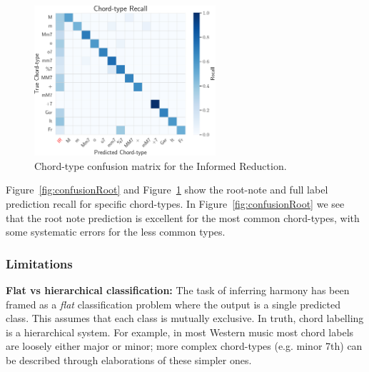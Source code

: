 \documentclass[12pt,a4paper,twoside,openany]{report} \usepackage[pdfborder={0 0 0}]{hyperref}    %
\theoremstyle{definition} \newtheorem{definition}{Definition}[section]
\begin{document}
  \begin{figure}[H]
    \begin{center}
      \includegraphics[width=0.6\textwidth]{figs/eval/Harmony/chordLabelHeatMap.pdf}
    \end{center}
    \caption{Chord-type confusion matrix for the Informed Reduction.} 
    \label{fig:confusionLabel}
  \end{figure}

  Figure~\ref{fig:confusionRoot} and Figure~\ref{fig:confusionLabel} show the root-note and full label prediction
  recall for specific chord-types. In Figure~\ref{fig:confusionRoot} we see that the root note prediction is excellent
  for the most common chord-types, with some systematic errors for the less common types. 

  \subsubsection{Limitations}

  \textbf{Flat vs hierarchical classification: } The task of inferring harmony has been framed as a \textit{flat}
  classification problem where the output is a single predicted class. This assumes that each class is mutually
  exclusive. In truth, chord labelling is a hierarchical system. For example, in most Western music most chord labels
  are loosely either major or minor; more complex chord-types (e.g. minor 7th) can be described through elaborations of
  these simpler ones.
\end{document}
